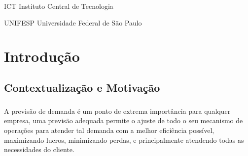\documentclass[	12pt, Times, openright, twoside, a4paper, english, brazil]{abntex2}
\begin{document}
\listoffigures*
\cleardoublepage

\listoftables*
\cleardoublepage

\begin{siglas}
\item[ICT] Instituto Central de Tecnologia
\item[UNIFESP] Universidade Federal de São Paulo
\end{siglas}


\tableofcontents*
\cleardoublepage

\textual

\chapter{Introdução}
\section{Contextualização e Motivação}

\paragraph*{} A previsão de demanda é um ponto de extrema importância para qualquer empresa, uma previsão adequada permite o ajuste de todo o seu mecanismo de operações para atender tal demanda com a melhor eficiência possível, maximizando lucros, minimizando perdas, e principalmente atendendo todas as necessidades do cliente.
\end{document}

